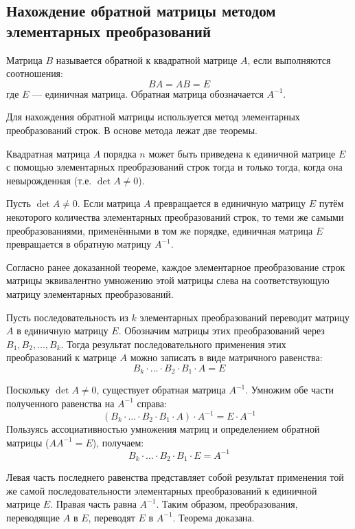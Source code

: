 \subsection{Нахождение обратной матрицы методом элементарных преобразований}

\begin{definition}
Матрица $B$ называется обратной к квадратной матрице $A$, если выполняются соотношения:
\[ BA = AB = E \]
где $E$ — единичная матрица. Обратная матрица обозначается $A^{-1}$.
\end{definition}

Для нахождения обратной матрицы используется метод элементарных преобразований строк. В основе метода лежат две теоремы.

\begin{theorem}
Квадратная матрица $A$ порядка $n$ может быть приведена к единичной матрице $E$ с помощью элементарных преобразований строк тогда и только тогда, когда она невырожденная (т.е. $\det A \neq 0$).
\end{theorem}

\begin{theorem}
Пусть $\det A \neq 0$. Если матрица $A$ превращается в единичную матрицу $E$ путём некоторого количества элементарных преобразований строк, то теми же самыми преобразованиями, применёнными в том же порядке, единичная матрица $E$ превращается в обратную матрицу $A^{-1}$.
\end{theorem}

\begin{tcolorbox}[title=Доказательство, breakable]
Согласно ранее доказанной теореме, каждое элементарное преобразование строк матрицы эквивалентно умножению этой матрицы слева на соответствующую матрицу элементарных преобразований.

Пусть последовательность из $k$ элементарных преобразований переводит матрицу $A$ в единичную матрицу $E$. Обозначим матрицы этих преобразований через $B_1, B_2, \dots, B_k$. Тогда результат последовательного применения этих преобразований к матрице $A$ можно записать в виде матричного равенства:
\[ B_k \cdot \dots \cdot B_2 \cdot B_1 \cdot A = E \]

Поскольку $\det A \neq 0$, существует обратная матрица $A^{-1}$. Умножим обе части полученного равенства на $A^{-1}$ справа:
\[ (B_k \cdot \dots \cdot B_2 \cdot B_1 \cdot A) \cdot A^{-1} = E \cdot A^{-1} \]
Пользуясь ассоциативностью умножения матриц и определением обратной матрицы ($A A^{-1} = E$), получаем:
\[ B_k \cdot \dots \cdot B_2 \cdot B_1 \cdot E = A^{-1} \]

Левая часть последнего равенства представляет собой результат применения той же самой последовательности элементарных преобразований к единичной матрице $E$. Правая часть равна $A^{-1}$. Таким образом, преобразования, переводящие $A$ в $E$, переводят $E$ в $A^{-1}$. Теорема доказана.
\end{tcolorbox}

